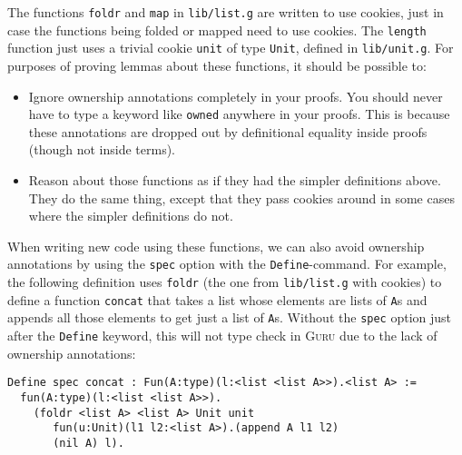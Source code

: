 \documentclass{book}[12pt]
\newcommand{\guru}[0]{\textsc{Guru}\xspace}
\begin{document}
The functions \texttt{foldr} and \texttt{map} in \texttt{lib/list.g}
are written to use cookies, just in case the functions being folded or
mapped need to use cookies.  The \texttt{length} function just uses a
trivial cookie \texttt{unit} of type \texttt{Unit}, defined in
\texttt{lib/unit.g}.  For purposes of proving lemmas about these
functions, it should be possible to:

\begin{itemize}

\item Ignore ownership annotations completely in your proofs.  You
should never have to type a keyword like \texttt{owned} anywhere in
your proofs.  This is because these annotations are dropped out by
definitional equality inside proofs (though not inside terms).

\item Reason about those functions as if they had the simpler
definitions above.  They do the same thing, except that they pass
cookies around in some cases where the simpler definitions do not.
\end{itemize}

\noindent When writing new code using these functions, we can also
avoid ownership annotations by using the \texttt{spec} option with the
\texttt{Define}-command.  For example, the following definition uses
\texttt{foldr} (the one from \texttt{lib/list.g} with cookies) to
define a function \texttt{concat} that takes a list whose elements are
lists of \texttt{A}s and appends all those elements to get just a list
of \texttt{A}s.  Without the \texttt{spec} option just after the
\texttt{Define} keyword, this will not type check in \guru due to the
lack of ownership annotations:

\begin{verbatim}
Define spec concat : Fun(A:type)(l:<list <list A>>).<list A> :=
  fun(A:type)(l:<list <list A>>).
    (foldr <list A> <list A> Unit unit 
       fun(u:Unit)(l1 l2:<list A>).(append A l1 l2) 
       (nil A) l).
\end{verbatim}
\end{document}
